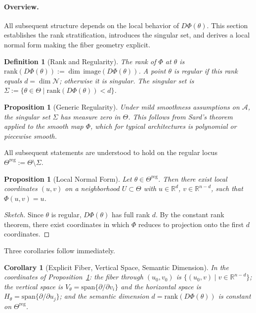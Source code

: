 \documentclass[twocolumn,10pt]{article}
\theoremstyle{thmstyle}
\newtheorem{corollary}[theorem]{Corollary}
\newtheorem{proposition}[theorem]{Proposition}
\theoremstyle{defstyle}
\newtheorem{definition}[theorem]{Definition}
\begin{document}
\paragraph{Overview.}
All subsequent structure depends on the local behavior of $D\Phi(\theta)$.
This section establishes the rank stratification, introduces the
singular set, and derives a local normal form making the fiber geometry
explicit.

\begin{definition}[Rank and Regularity]
The \emph{rank} of $\Phi$ at $\theta$ is
$\mathrm{rank}(D\Phi(\theta)) := \dim\,\mathrm{image}(D\Phi(\theta))$.
A point $\theta$ is \emph{regular} if this rank equals $d = \dim\mathcal{N}$;
otherwise it is \emph{singular}. The \emph{singular set} is
$\Sigma := \{\theta \in \Theta \mid \mathrm{rank}(D\Phi(\theta)) < d\}$.
\end{definition}

\begin{proposition}[Generic Regularity]
Under mild smoothness assumptions on $\mathcal{A}$, the singular set
$\Sigma$ has measure zero in $\Theta$. This follows from Sard's theorem
applied to the smooth map $\Phi$, which for typical architectures is
polynomial or piecewise smooth.
\end{proposition}

All subsequent statements are understood to hold on the regular locus
$\Theta^{\mathrm{reg}} := \Theta \setminus \Sigma$.

\begin{proposition}[Local Normal Form]
\label{prop:local-normal-form}
Let $\theta \in \Theta^{\mathrm{reg}}$. Then there exist local
coordinates $(u,v)$ on a neighborhood $U \subset \Theta$ with
$u \in \mathbb{R}^d$, $v \in \mathbb{R}^{n-d}$, such that
$\Phi(u,v) = u$.
\end{proposition}

\begin{proof}[Sketch]
Since $\theta$ is regular, $D\Phi(\theta)$ has full rank $d$. By the
constant rank theorem, there exist coordinates in which $\Phi$ reduces
to projection onto the first $d$ coordinates.
\end{proof}

Three corollaries follow immediately.

\begin{corollary}[Explicit Fiber, Vertical Space, Semantic Dimension]
In the coordinates of Proposition~\ref{prop:local-normal-form}: the
fiber through $(u_0, v_0)$ is $\{(u_0, v) \mid v \in \mathbb{R}^{n-d}\}$;
the vertical space is $V_\theta = \mathrm{span}\{\partial/\partial v_i\}$
and the horizontal space is $H_\theta = \mathrm{span}\{\partial/\partial u_j\}$;
and the semantic dimension $d = \mathrm{rank}(D\Phi(\theta))$ is constant
on $\Theta^{\mathrm{reg}}$.
\end{corollary}
\end{document}
